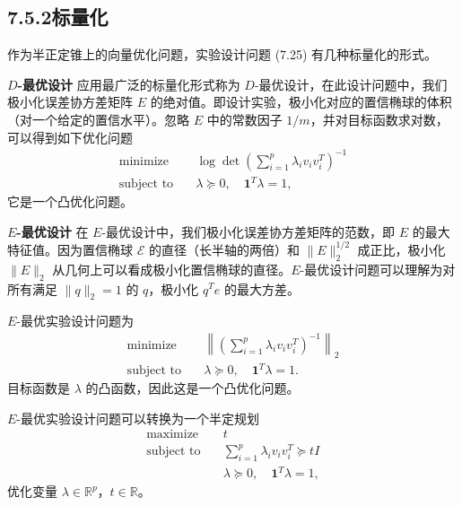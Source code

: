 \documentclass[UTF8, 12pt, fontset=fandol, oneside]{ctexart}
\begin{document}
\subsection*{7.5.2\quad 标量化}

作为半正定锥上的向量优化问题，实验设计问题 (7.25) 有几种标量化的形式。

\noindent\textbf{$D$-最优设计}\quad
应用最广泛的标量化形式称为 $D$-最优设计，在此设计问题中，我们极小化误差协方差矩阵 $E$ 的绝对值。即设计实验，极小化对应的置信椭球的体积（对一个给定的置信水平）。忽略 $E$ 中的常数因子 $1/m$，并对目标函数求对数，可以得到如下优化问题
\begin{equation}
\begin{aligned}
\text{minimize}\quad & \log\det\left(\sum_{i=1}^p\lambda_iv_iv_i^T\right)^{-1}\\
\text{subject to}\quad & \lambda\succeq 0,\quad \mathbf{1}^T\lambda=1,
\end{aligned}
\tag{7.26}
\end{equation}
它是一个凸优化问题。

\noindent\textbf{$E$-最优设计}\quad
在 $E$-最优设计中，我们极小化误差协方差矩阵的范数，即 $E$ 的最大特征值。因为置信椭球 $\mathcal{E}$ 的直径（长半轴的两倍）和 $\|E\|_2^{1/2}$ 成正比，极小化 $\|E\|_2$ 从几何上可以看成极小化置信椭球的直径。$E$-最优设计问题可以理解为对所有满足 $\|q\|_2=1$ 的 $q$，极小化 $q^Te$ 的最大方差。

$E$-最优实验设计问题为
\[
\begin{aligned}
\text{minimize}\quad & \left\|\left(\sum_{i=1}^p\lambda_iv_iv_i^T\right)^{-1}\right\|_2\\
\text{subject to}\quad & \lambda\succeq 0,\quad \mathbf{1}^T\lambda=1.
\end{aligned}
\]
目标函数是 $\lambda$ 的凸函数，因此这是一个凸优化问题。

$E$-最优实验设计问题可以转换为一个半定规划
\begin{equation}
\begin{aligned}
\text{maximize}\quad & t\\
\text{subject to}\quad & \sum_{i=1}^p\lambda_iv_iv_i^T\succeq tI\\
& \lambda\succeq 0,\quad \mathbf{1}^T\lambda=1,
\end{aligned}
\tag{7.27}
\end{equation}
优化变量 $\lambda\in\mathbb{R}^p$，$t\in\mathbb{R}$。
\end{document}
